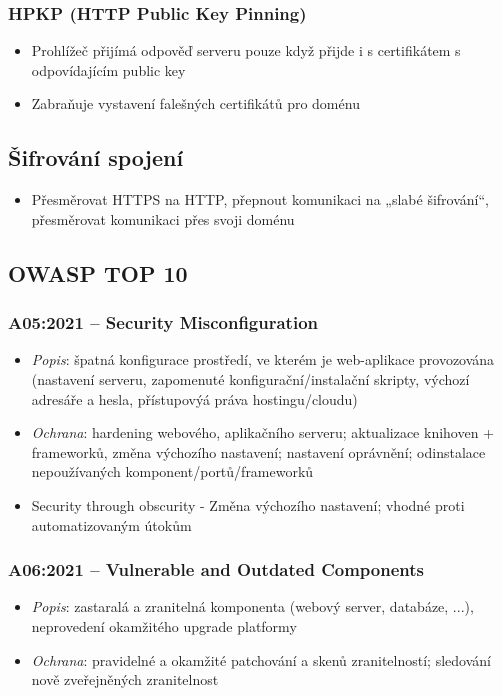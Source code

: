 \documentclass[10pt,a4paper]{article}
\begin{document}
\subsubsection*{HPKP (HTTP Public Key Pinning)}
\begin{itemize}
    \item Prohlížeč přijímá odpověď serveru pouze když přijde i s certifikátem s odpovídajícím public key
    \item Zabraňuje vystavení falešných certifikátů pro doménu
\end{itemize}

\subsection{Šifrování spojení}
\begin{itemize}
    \item Přesměrovat HTTPS na HTTP, přepnout komunikaci na „slabé šifrování“, přesměrovat komunikaci přes svoji doménu
\end{itemize}

\subsection{OWASP TOP 10}

\subsubsection*{A05:2021 – Security Misconfiguration}
\begin{itemize}
    \item \textit{Popis}: špatná konfigurace prostředí, ve kterém je web-aplikace provozována (nastavení serveru, zapomenuté konfigurační/instalační skripty, výchozí adresáře a hesla, přístupovýá práva hostingu/cloudu)
    \item \textit{Ochrana}: hardening webového, aplikačního serveru; aktualizace knihoven + frameworků, změna výchozího nastavení; nastavení oprávnění; odinstalace nepoužívaných komponent/portů/frameworků
    \item Security through obscurity -  Změna výchozího nastavení; vhodné proti automatizovaným útokům
\end{itemize}

\subsubsection*{A06:2021 – Vulnerable and Outdated Components}
\begin{itemize}
    \item \textit{Popis}: zastaralá a zranitelná komponenta (webový server, databáze, ...), neprovedení okamžitého upgrade platformy
    \item \textit{Ochrana}: pravidelné a okamžité patchování a skenů zranitelností; sledování nově zveřejněných zranitelnost
\end{itemize}
\end{document}

